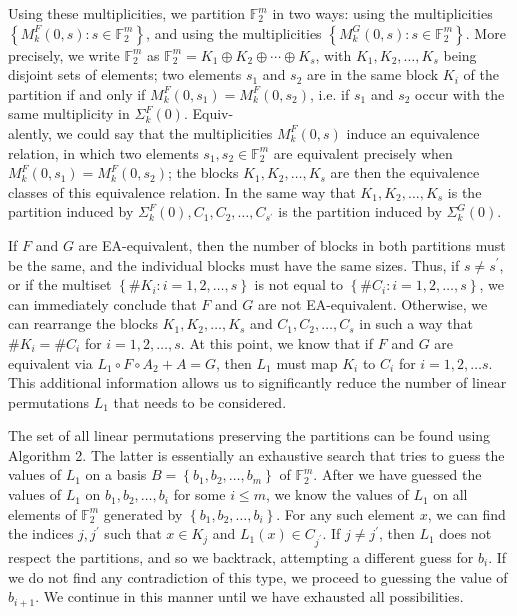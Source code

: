 \documentclass[10pt]{article}
\begin{document}
Using these multiplicities, we partition $\mathbb{F}_{2}^{m}$ in two ways: using the multiplicities $\left\{M_{k}^{F}(0, s): s \in \mathbb{F}_{2}^{m}\right\}$, and using the multiplicities $\left\{M_{k}^{G}(0, s): s \in \mathbb{F}_{2}^{m}\right\}$. More precisely, we write $\mathbb{F}_{2}^{m}$ as $\mathbb{F}_{2}^{m}=K_{1} \oplus K_{2} \oplus \cdots \oplus K_{s}$, with $K_{1}, K_{2}, \ldots, K_{s}$ being disjoint sets of elements; two elements $s_{1}$ and $s_{2}$ are in the same block $K_{i}$ of the partition if and only if $M_{k}^{F}\left(0, s_{1}\right)=M_{k}^{F}\left(0, s_{2}\right)$, i.e. if $s_{1}$ and $s_{2}$ occur with the same multiplicity in $\Sigma_{k}^{F}(0)$. Equiv-\\
alently, we could say that the multiplicities $M_{k}^{F}(0, s)$ induce an equivalence relation, in which two elements $s_{1}, s_{2} \in \mathbb{F}_{2}^{m}$ are equivalent precisely when $M_{k}^{F}\left(0, s_{1}\right)=M_{k}^{F}\left(0, s_{2}\right)$; the blocks $K_{1}, K_{2}, \ldots, K_{s}$ are then the equivalence classes of this equivalence relation. In the same way that $K_{1}, K_{2}, \ldots, K_{s}$ is the partition induced by $\Sigma_{k}^{F}(0), C_{1}, C_{2}, \ldots, C_{s^{\prime}}$ is the partition induced by $\Sigma_{k}^{G}(0)$.

If $F$ and $G$ are EA-equivalent, then the number of blocks in both partitions must be the same, and the individual blocks must have the same sizes. Thus, if $s \neq s^{\prime}$, or if the multiset $\left\{\# K_{i}: i=1,2, \ldots, s\right\}$ is not equal to $\left\{\# C_{i}: i=1,2, \ldots, s\right\}$, we can immediately conclude that $F$ and $G$ are not EA-equivalent. Otherwise, we can rearrange the blocks $K_{1}, K_{2}, \ldots, K_{s}$ and $C_{1}, C_{2}, \ldots, C_{s}$ in such a way that $\# K_{i}=\# C_{i}$ for $i=1,2, \ldots, s$. At this point, we know that if $F$ and $G$ are equivalent via $L_{1} \circ F \circ A_{2}+A=G$, then $L_{1}$ must map $K_{i}$ to $C_{i}$ for $i=1,2, \ldots s$. This additional information allows us to significantly reduce the number of linear permutations $L_{1}$ that needs to be considered.

The set of all linear permutations preserving the partitions can be found using Algorithm 2. The latter is essentially an exhaustive search that tries to guess the values of $L_{1}$ on a basis $B=\left\{b_{1}, b_{2}, \ldots, b_{m}\right\}$ of $\mathbb{F}_{2}^{m}$. After we have guessed the values of $L_{1}$ on $b_{1}, b_{2}, \ldots, b_{i}$ for some $i \leq m$, we know the values of $L_{1}$ on all elements of $\mathbb{F}_{2}^{m}$ generated by $\left\{b_{1}, b_{2}, \ldots, b_{i}\right\}$. For any such element $x$, we can find the indices $j, j^{\prime}$ such that $x \in K_{j}$ and $L_{1}(x) \in C_{j^{\prime}}$. If $j \neq j^{\prime}$, then $L_{1}$ does not respect the partitions, and so we backtrack, attempting a different guess for $b_{i}$. If we do not find any contradiction of this type, we proceed to guessing the value of $b_{i+1}$. We continue in this manner until we have exhausted all possibilities.
\end{document}
